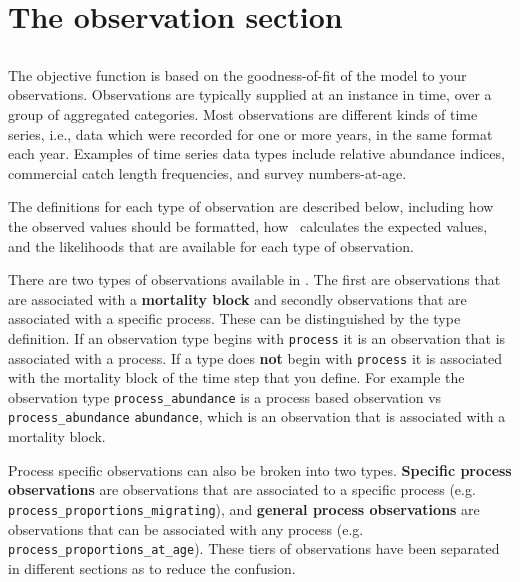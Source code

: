 \section{The observation section\label{sec:observation-section}}

\subsection{\label{sec:Observations}}

The objective function is based on the goodness-of-fit of the model to your observations. Observations are typically supplied at an instance in time, over a group of aggregated categories. Most observations are different kinds of time series, i.e., data which were recorded for one or more years, in the same format each year. Examples of time series data types include relative abundance indices, commercial catch length frequencies, and survey numbers-at-age.

The definitions for each type of observation are described below, including how the observed values should be formatted, how \CNAME\ calculates the expected values, and the likelihoods that are available for each type of observation.

There are two types of observations available in \CNAME. The first are observations that are associated with a \textbf{mortality block} and secondly observations that are associated with a specific process. These can be distinguished by the type definition. If an observation type begins with \texttt{process} it is an observation that is associated with a process. If a type does \textbf{not} begin with \texttt{process} it is associated with the mortality block of the time step that you define. For example the observation type \texttt{process\_abundance} is a process based observation vs \texttt{process\_abundance} \texttt{abundance}, which is an observation that is associated with a mortality block.

Process specific observations can also be broken into two types. \textbf{Specific process observations} are observations that are associated to a specific process (e.g. \texttt{process\_proportions\_migrating}), and \textbf{general process observations} are observations that can be associated with any process (e.g. \texttt{process\_proportions\_at\_age}). These tiers of observations have been separated in different sections as to reduce the confusion.

\subsubsection{}


